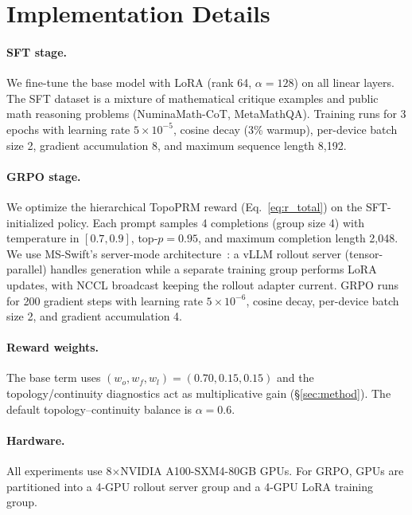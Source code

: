     \section{Implementation Details}
    \label{app:details}
    
    \paragraph{SFT stage.}
    We fine-tune the base model with LoRA (rank 64, $\alpha{=}128$) on all linear layers.
    The SFT dataset is a mixture of mathematical critique examples and public math reasoning problems (NuminaMath-CoT, MetaMathQA).
    Training runs for 3 epochs with learning rate $5 \times 10^{-5}$, cosine decay (3\% warmup), per-device batch size 2, gradient accumulation 8, and maximum sequence length 8{,}192.
    
    \paragraph{GRPO stage.}
    We optimize the hierarchical TopoPRM reward (Eq.~\ref{eq:r_total}) on the SFT-initialized policy.
    Each prompt samples 4 completions (group size 4) with temperature in $[0.7, 0.9]$, top-$p{=}0.95$, and maximum completion length 2{,}048.
    We use MS-Swift's server-mode architecture~\citep{msswift}: a vLLM rollout server (tensor-parallel) handles generation while a separate training group performs LoRA updates, with NCCL broadcast keeping the rollout adapter current.
    GRPO runs for 200 gradient steps with learning rate $5 \times 10^{-6}$, cosine decay, per-device batch size 2, and gradient accumulation 4.
    
    \paragraph{Reward weights.}
    The base term uses $(w_o, w_f, w_l) = (0.70, 0.15, 0.15)$ and the topology/continuity diagnostics act as multiplicative gain (\S\ref{sec:method}). The default topology--continuity balance is $\alpha{=}0.6$.
    
    \paragraph{Hardware.}
    All experiments use 8$\times$NVIDIA A100-SXM4-80GB GPUs.
    For GRPO, GPUs are partitioned into a 4-GPU rollout server group and a 4-GPU LoRA training group.
    
